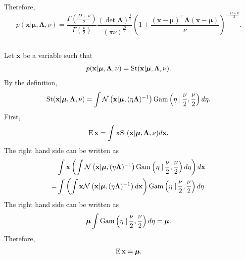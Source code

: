 %
Therefore,
%
\begin{equation}
p(\mathbf{x} | \bm{\mu}, \bm{\Lambda}, \nu)
=
\frac{\Gamma(\frac{D + \nu}{2})}{\Gamma (\frac{\nu}{2})}
\frac{(\det \bm{\Lambda}) ^ \frac{1}{2}}{(\pi \nu) ^ \frac{D}{2}}
\left(
	1 
	+ 
	\frac
	{(\mathbf{x} - \bm{\mu}) ^ \intercal 
	\bm{\Lambda} 
	(\mathbf{x} - \bm{\mu})}
	{\nu}
\right) ^ {- \frac{D + \nu}{2}}.
\end{equation}
%


\subsection{}
\label{2.49}
Let $\mathbf{x}$ be a variable such that
%
\begin{equation}
p(\mathbf{x} | \bm{\mu}, \bm{\Lambda}, \nu)
=
{\rm St} (\mathbf{x} | \bm{\mu}, \bm{\Lambda}, \nu).
\end{equation}
%
By the definition,
%
\begin{equation}
{\rm St} (\mathbf{x} | \bm{\mu}, \bm{\Lambda}, \nu)
=
\int
\mathcal{N} 
\left(
	\mathbf{x} 
	| 
	\bm{\mu}, 
	(\eta \bm{\Lambda}) ^ {- 1}
\right)
{\rm Gam} 
\left(
	\eta 
	\left.
	\right \vert
	\frac{\nu}{2}, 
	\frac{\nu}{2}
\right)
d\eta.
\end{equation}
%
First,
%
\begin{equation}
\operatorname{E} \mathbf{x}
=
\int
\mathbf{x}
{\rm St} (\mathbf{x} | \bm{\mu}, \bm{\Lambda}, \nu)
d\mathbf{x}.
\end{equation}
%
The right hand side can be written as
%
\begin{equation}
\begin{aligned}
&
\int
\mathbf{x}
\left(
	\int
	\mathcal{N} 
	\left(
		\mathbf{x} 
		| 
		\bm{\mu}, 
		(\eta \bm{\Lambda}) ^ {- 1}
	\right)
	{\rm Gam} 
	\left(
		\eta 
		\left.
		\right \vert
		\frac{\nu}{2}, 
		\frac{\nu}{2}
	\right)
	d\eta
\right)
d\mathbf{x} 
\\
=&
\int
\left(
	\int
	\mathbf{x}
	\mathcal{N} 
	\left(
		\mathbf{x} 
		| 
		\bm{\mu}, 
		(\eta \bm{\Lambda}) ^ {- 1}
	\right)
	d\mathbf{x}
\right)
{\rm Gam} 
\left(
	\eta 
	\left.
	\right \vert
	\frac{\nu}{2}, 
	\frac{\nu}{2}
\right)
d\eta.
\end{aligned}
\end{equation}
%
The right hand side can be written as
%
\begin{equation}
\bm{\mu}
\int
{\rm Gam}
\left(
	\eta 
	\left.
	\right \vert
	\frac{\nu}{2}, 
	\frac{\nu}{2}
\right)
d\eta
=
\bm{\mu}.
\end{equation}
%
Therefore,
%
\begin{equation}
\operatorname{E} \mathbf{x}
=
\bm{\mu}.
\end{equation}
%

